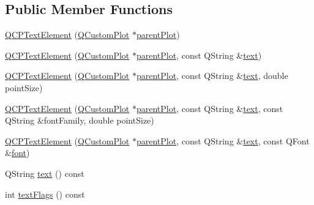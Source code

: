 \subsection*{Public Member Functions}
\begin{DoxyCompactItemize}
\item 
\mbox{\hyperlink{class_q_c_p_text_element_ae1de18bdb1e7ba959f132018dd9a0258}{Q\+C\+P\+Text\+Element}} (\mbox{\hyperlink{class_q_custom_plot}{Q\+Custom\+Plot}} $\ast$\mbox{\hyperlink{class_q_c_p_layerable_a473edb813a4c1929d6b6a8fe3ff3faf7}{parent\+Plot}})
\item 
\mbox{\hyperlink{class_q_c_p_text_element_a00f08a8a3363ad8d7d12ca0db4922b6b}{Q\+C\+P\+Text\+Element}} (\mbox{\hyperlink{class_q_custom_plot}{Q\+Custom\+Plot}} $\ast$\mbox{\hyperlink{class_q_c_p_layerable_a473edb813a4c1929d6b6a8fe3ff3faf7}{parent\+Plot}}, const Q\+String \&\mbox{\hyperlink{class_q_c_p_text_element_a453c24723b76fdcae405a8a7b0d02614}{text}})
\item 
\mbox{\hyperlink{class_q_c_p_text_element_a2684e65def4a5daf80be9f5f149ca9b2}{Q\+C\+P\+Text\+Element}} (\mbox{\hyperlink{class_q_custom_plot}{Q\+Custom\+Plot}} $\ast$\mbox{\hyperlink{class_q_c_p_layerable_a473edb813a4c1929d6b6a8fe3ff3faf7}{parent\+Plot}}, const Q\+String \&\mbox{\hyperlink{class_q_c_p_text_element_a453c24723b76fdcae405a8a7b0d02614}{text}}, double point\+Size)
\item 
\mbox{\hyperlink{class_q_c_p_text_element_adb4bcd3743dbfabfedee4fe9c2ee93da}{Q\+C\+P\+Text\+Element}} (\mbox{\hyperlink{class_q_custom_plot}{Q\+Custom\+Plot}} $\ast$\mbox{\hyperlink{class_q_c_p_layerable_a473edb813a4c1929d6b6a8fe3ff3faf7}{parent\+Plot}}, const Q\+String \&\mbox{\hyperlink{class_q_c_p_text_element_a453c24723b76fdcae405a8a7b0d02614}{text}}, const Q\+String \&font\+Family, double point\+Size)
\item 
\mbox{\hyperlink{class_q_c_p_text_element_a00b75787b77b39bbd083813c2a7b2520}{Q\+C\+P\+Text\+Element}} (\mbox{\hyperlink{class_q_custom_plot}{Q\+Custom\+Plot}} $\ast$\mbox{\hyperlink{class_q_c_p_layerable_a473edb813a4c1929d6b6a8fe3ff3faf7}{parent\+Plot}}, const Q\+String \&\mbox{\hyperlink{class_q_c_p_text_element_a453c24723b76fdcae405a8a7b0d02614}{text}}, const Q\+Font \&\mbox{\hyperlink{class_q_c_p_text_element_a9247189a1c2b2bf5604645a7396b2ddc}{font}})
\item 
Q\+String \mbox{\hyperlink{class_q_c_p_text_element_a453c24723b76fdcae405a8a7b0d02614}{text}} () const
\item 
int \mbox{\hyperlink{class_q_c_p_text_element_a1937ed3b7454d7e815f6027895a7d480}{text\+Flags}} () const

\end{DoxyCompactItemize}
